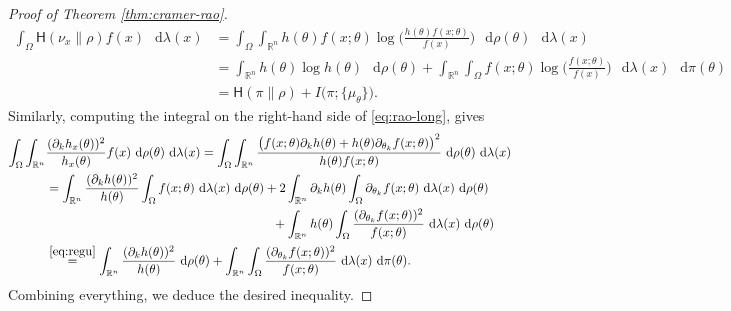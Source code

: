 \documentclass[10pt,a4paper]{amsart}
\newcommand*\diff{\mathop{}\!\mathrm{d}}
\newcommand{\HH}{\mathsf{H}}
\newcommand{\R}{\mathbb{R}} %
\begin{document}
\begin{proof} [Proof of Theorem \ref{thm:cramer-rao}]
\begin{equation}
\begin{split}
\int_\Omega \HH(\nu_x\|\rho)f(x) \,\diff\lambda(x) & = \int_\Omega \int_{\R^n} h(\theta) f(x;\theta) \log\Big( \frac{h(\theta)f(x;\theta)}{f(x)}\Big) \, \diff\rho(\theta)\,\diff\lambda(x) 
\\ & = \int_{\R^n} h(\theta) \log h(\theta)\,\diff\rho(\theta) + \int_{\R^n} \int_\Omega f(x;\theta) \log \big(\frac{f(x;\theta)}{f(x)} \big)\, \diff\lambda(x)\,\diff\pi(\theta)
\\ & = \HH(\pi\|\rho) + I\big(\pi;\{\mu_\theta\}\big).
\end{split}
\end{equation}
Similarly, computing the integral on the right-hand side of \eqref{eq:rao-long}, gives
\begin{equation*}
\begin{split}
 \int_\Omega \int_{\R^n} &\frac{(\partial_k h_x(\theta))^2}{h_x(\theta)}f(x) \,\diff\rho(\theta)\,\diff\lambda(x) =  \int_\Omega \int_{\R^n} \frac{\big(f(x;\theta)\partial_k h(\theta) + h(\theta) \partial_{\theta_k} f(x;\theta)\big)^2}{h(\theta)f(x;\theta)} \,\diff\rho(\theta)\,\diff\lambda(x)
 \\ & = \int_{\R^n}\frac{(\partial_k h(\theta))^2}{h(\theta)} \int_\Omega f(x;\theta) \, \diff\lambda(x)\,\diff\rho(\theta) + 2 \int_{\R^n} \partial_k h(\theta) \int_\Omega \partial_{\theta_k} f(x;\theta) \,\diff\lambda(x) \,\diff\rho(\theta)
 \\ & \qquad\qquad\qquad\qquad\qquad\qquad\qquad\qquad\qquad + \int_{\R^n} h(\theta) \int_\Omega \frac{(\partial_{\theta_k}f(x;\theta))^2}{f(x;\theta)}\,\diff\lambda(x)\,\diff\rho(\theta)
 \\ & \stackrel{\eqref{eq:regu}}{=} \int_{\R^n} \frac{(\partial_{k} h(\theta))^2}{h(\theta)}\,\diff\rho(\theta) + \int_{\R^n} \int_\Omega \frac{(\partial_{\theta_k} f(x;\theta))^2}{f(x;\theta)} \,\diff\lambda(x)\,\diff\pi(\theta).
\end{split}
\end{equation*}
Combining everything, we deduce the desired inequality.
\end{proof}
\end{document}
